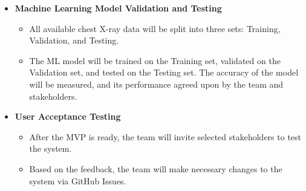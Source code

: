 \documentclass[12pt, titlepage]{article}
\begin{document}
\begin{itemize}
  \item[] {\textbf{Machine Learning Model Validation and Testing}}
  \begin{itemize}
    \item All available chest X-ray data will be split into three sets: Training, Validation, and Testing.
    \item The ML model will be trained on the Training set, validated on the Validation set, and tested on the Testing set. The accuracy of the model will be measured, and its performance agreed upon by the team and stakeholders.
  \end{itemize}
  
  \item[] {\textbf{User Acceptance Testing}}
  \begin{itemize}
    \item After the MVP is ready, the team will invite selected stakeholders to test the system.
    \item Based on the feedback, the team will make necessary changes to the system via GitHub Issues.
  \end{itemize}
\end{itemize}
\end{document}
